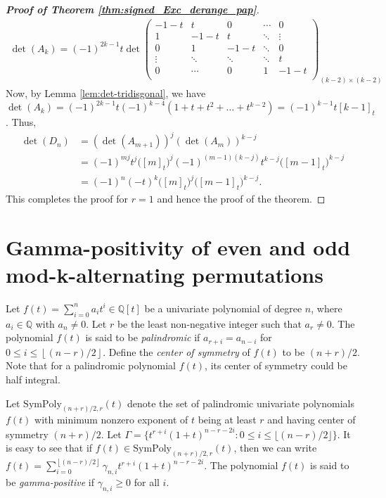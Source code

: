 \documentclass[12pt]{article}
\newcommand{\PP}{ \mathrm{SymPoly}}
\newcommand{\QQ}{ \mathbb{Q}}
\newcommand{\floor}[1]{\left\lfloor #1 \right\rfloor}
\newcommand{\nmrhalf}{\lfloor (n-r)/2 \rfloor}
\begin{document}
\begin{proof}[\textbf{Proof of Theorem \ref{thm:signed_Exc_derange_pap}}]
\begin{align*}
 \det(A_k)=(-1)^{2k-1}t \det \left(
 	\begin{array}{ccccc}
 	-1-t & t & 0 &  \cdots & 0 \\
 	1 & -1-t & t & \ddots & \vdots \\
 	0 & 1 & -1-t &  \ddots & 0\\
 	\vdots & \ddots & \ddots & \ddots & t\\
        0 & \cdots & 0 & 1 & -1-t  \\
 	\end{array}
 	\right)_{(k-2)\times (k-2)}      
\end{align*}
Now, by Lemma \ref{lem:det-tridisgonal}, we have $ \det(A_k)=(-1)^{2k-1}t(-1)^{k-4}(1+t+t^2+\hdots+t^{k-2})=(-1)^{k-1}t[k-1]_t$. 
Thus, 
\begin{align*}
\det(D_n) & =(\det(A_{m+1}))^j  (\det(A_m))^{k-j} \\
& = (-1)^{mj} t^j \big([m]_t \big)^j
(-1)^{(m-1)(k-j)} t^{k-j} \big([m-1]_t\big)^{k-j}\\
& = (-1)^{n} (-t)^k \big([m]_t \big)^ j \big([m-1]_t\big)^{k-j}. 
\end{align*}
This completes the proof for $r=1$ and hence the proof of the theorem.
\end{proof} 





\section{Gamma-positivity of even and odd mod-k-alternating permutations}
\label{sec:gamma-positivity}

Let $f(t)  = \sum_{i=0}^n a_i t^i \in \QQ[t]$ be a  univariate polynomial of degree $n$, where $a_i \in \QQ$ with $a_n \not= 0$.  Let $r$ be the least non-negative integer such that $a_r \not= 0$.  The polynomial $f(t)$ is said to be {\it palindromic} if $a_{r+i} = a_{n-i}$ for $0 \leq i \leq \floor{(n-r)/2}$.  Define the {\it center of symmetry} of $f(t)$ to be $(n+r)/2$.  Note that for a palindromic polynomial $f(t)$, its center of symmetry could be half integral.

Let $\PP_{(n+r)/2, r}(t)$ denote the set of palindromic 
univariate polynomials $f(t)$ with minimum nonzero exponent of $t$ being at least $r$ and having center of symmetry $(n+r)/2$.  Let 
$\Gamma = \{ t^{r+i}(1+t)^{n-r-2i}: 0 \leq i \leq \nmrhalf \}$.
It is easy to see that if $f(t) \in \PP_{(n+r)/2, r}(t)$, then we can write $f(t) = \sum_{i=0}^{\floor{(n-r)/2}} \gamma_{n,i} t^{r+i} (1+t)^{n-r-2i}$. The polynomial $f(t)$ is said to be {\it gamma-positive} if $\gamma_{n,i} \geq 0$ for all $i$.
\end{document}
